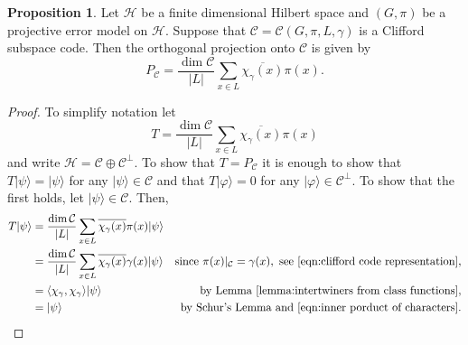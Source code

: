 \documentclass[11pt]{article}
\theoremstyle{definition}
\newtheorem{proposition}{Proposition}
\def\ket#1{| #1 \rangle}
\newcommand{\calC}{\mathcal{C}}
\newcommand{\calH}{\mathcal{H}}
\begin{document}
\begin{proposition}\label{lemma:code projection}
    Let $\calH$ be a finite dimensional Hilbert space and $(G,\pi)$ be a projective error model on $\calH$. Suppose that $\calC = \calC(G,\pi,L,\gamma)$ is a Clifford subspace code. Then the orthogonal projection onto $\calC$ is given by
    \begin{equation*}
        P_\calC = \frac{\dim\calC}{|L|}\sum_{x \in L}\overline{\chi_\gamma(x)}\pi(x).
    \end{equation*}
\end{proposition}
\begin{proof}
    To simplify notation let
    \begin{equation*}
        T = \frac{\dim\calC}{|L|}\sum_{x \in L}\overline{\chi_\gamma(x)}\pi(x)
    \end{equation*}
    and write $\calH = \calC \oplus \calC^\perp$. To show that $T = P_\calC$ it is enough to show that $T\ket{\psi} = \ket{\psi}$ for any $\ket{\psi} \in \calC$ and that $T\ket{\varphi} = 0$ for any $\ket{\varphi} \in \calC^\perp$. To show that the first holds, let $\ket{\psi} \in \calC$. Then,
    \begin{align*}
        T \ket{\psi}
        & = \frac{\dim\calC}{|L|}\sum_{x \in L}\overline{\chi_\gamma(x)}\pi(x)\ket{\psi} & \\
        & = \frac{\dim\calC}{|L|}\sum_{x \in L}\overline{\chi_\gamma(x)}\gamma(x)\ket{\psi} & \text{since } \pi(x)|_\calC = \gamma(x), \text{ see \eqref{eqn:clifford code representation}}, \\
        & = \langle\chi_\gamma, \chi_\gamma\rangle\ket{\psi} & \text{by Lemma~\ref{lemma:intertwiners from class functions}}, \\
        & = \ket{\psi} & \text{by Schur's Lemma and \eqref{eqn:inner porduct of characters}}.
    \end{align*}


\end{proof}
\end{document}
